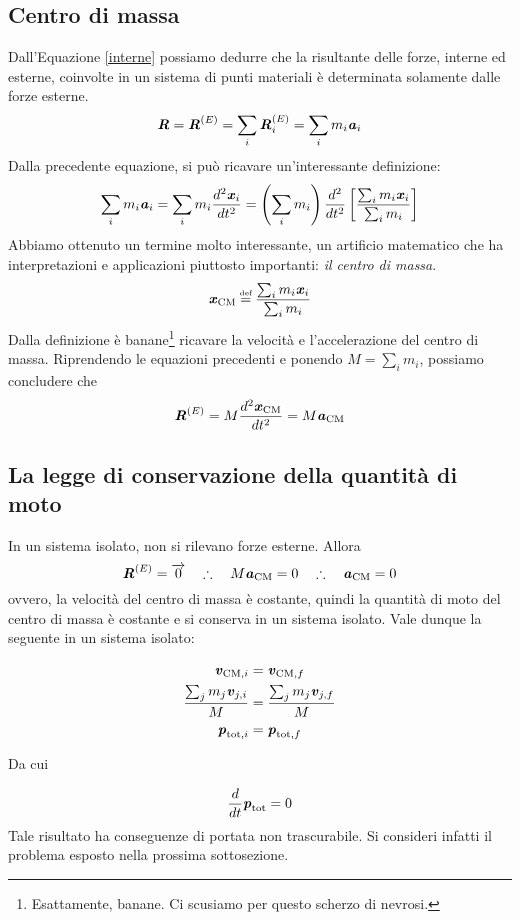 \subsection{Centro di massa}
Dall'Equazione \ref{interne} possiamo dedurre che la risultante delle
forze, interne ed esterne, coinvolte in un sistema di punti materiali
è determinata solamente dalle forze esterne.
\[ \textbf{\textit{R}} = \textbf{\textit{R}}^{(E)} = \sum_{i} \textbf{\textit{R}}^{(E)}_i = \sum_i m_i\textbf{\textit{a}}_i \]
Dalla precedente equazione, si può ricavare un'interessante definizione:
\[ \sum_i m_i\textbf{\textit{a}}_i = \sum_i m_i \frac{d^2\textbf{\textit{x}}_i}{dt^2} = \left(\sum_i m_i\right) \frac{d^2}{dt^2}\left[ \frac{\sum_i m_i\textbf{\textit{x}}_i}{\sum_i m_i} \right] \]
Abbiamo ottenuto un termine molto interessante, un artificio matematico
che ha interpretazioni e applicazioni piuttosto importanti: \textit{il
centro di massa}.
\begin{align}
    \vecsymb{x}_\text{CM} \eqdef \frac{\sum_i m_i\vecsymb{x}_i}{\sum_i m_i}
\end{align}
Dalla definizione è banane\footnote{Esattamente, banane. Ci scusiamo per questo scherzo di nevrosi.} ricavare la velocità e l'accelerazione del
centro di massa. Riprendendo le equazioni precedenti e ponendo $M = \sum_i m_i$,
possiamo concludere che
\[ \textbf{\textit{R}}^{(E)} = M\frac{d^2\textbf{\textit{x}}_\text{CM}}{dt^2} = M\textbf{\textit{a}}_\text{CM} \]

\subsection{La legge di conservazione della quantità di moto}
In un sistema isolato, non si rilevano forze esterne. Allora
\[ \textbf{\textit{R}}^{(E)} = \overrightarrow{0} \quad \therefore \quad M\textbf{\textit{a}}_\text{CM} = 0 \quad \therefore \quad \textbf{\textit{a}}_\text{CM} = 0 \]
ovvero, la velocità del centro di massa è costante, quindi la
quantità di moto del centro di massa è costante e si conserva in
un sistema isolato. Vale dunque la seguente in un sistema isolato:

\begin{align*}
    \textbf{\textit{v}}_{\text{CM}, i} &= \textbf{\textit{v}}_{\text{CM}, f}\\
    \frac{\sum_j m_j\textbf{\textit{v}}_{j,i}}{M} &= \frac{\sum_j m_j\textbf{\textit{v}}_{j,f}}{M}\\
    \textbf{\textit{p}}_{\text{tot}, i} &= \textbf{\textit{p}}_{\text{tot}, f}
\end{align*}

\noindent Da cui

\begin{align}
    \frac{d}{dt}\textbf{\textit{p}}_\text{tot} = 0
\end{align}
Tale risultato ha conseguenze di portata non trascurabile. Si consideri
infatti il problema esposto nella prossima sottosezione.


